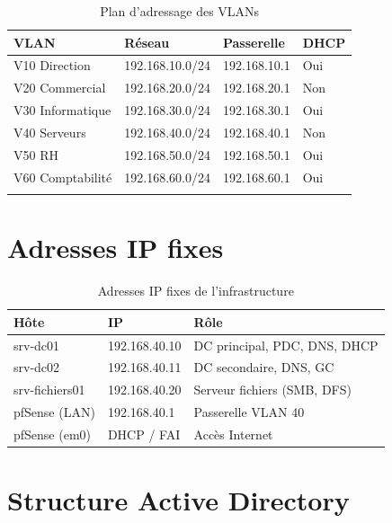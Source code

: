 \begin{longtable}{|p{3cm}|p{3cm}|p{3cm}|p{2cm}|}
    \hline
    \textbf{VLAN} & \textbf{Réseau} & \textbf{Passerelle} & \textbf{DHCP} \\
    \hline
    \endhead
    
    V10 Direction & 192.168.10.0/24 & 192.168.10.1 & Oui \\
    \hline
    V20 Commercial & 192.168.20.0/24 & 192.168.20.1 & Non \\
    \hline
    V30 Informatique & 192.168.30.0/24 & 192.168.30.1 & Oui \\
    \hline
    V40 Serveurs & 192.168.40.0/24 & 192.168.40.1 & Non \\
    \hline
    V50 RH & 192.168.50.0/24 & 192.168.50.1 & Oui \\
    \hline
    V60 Comptabilité & 192.168.60.0/24 & 192.168.60.1 & Oui \\
    \hline
    
    \caption{Plan d'adressage des VLANs}
    \label{tab:vlans}
\end{longtable}

\section{Adresses IP fixes}

\begin{table}[H]
    \centering
    \begin{tabularx}{\textwidth}{|l|l|p{4cm}|}
        \hline
        \textbf{Hôte} & \textbf{IP} & \textbf{Rôle} \\
        \hline
        srv-dc01 & 192.168.40.10 & DC principal, PDC, DNS, DHCP \\
        \hline
        srv-dc02 & 192.168.40.11 & DC secondaire, DNS, GC \\
        \hline
        srv-fichiers01 & 192.168.40.20 & Serveur fichiers (SMB, DFS) \\
        \hline
        pfSense (LAN) & 192.168.40.1 & Passerelle VLAN 40 \\
        \hline
        pfSense (em0) & DHCP / FAI & Accès Internet \\
        \hline
    \end{tabularx}
    \caption{Adresses IP fixes de l'infrastructure}
    \label{tab:ips}
\end{table}

\section{Structure Active Directory}

